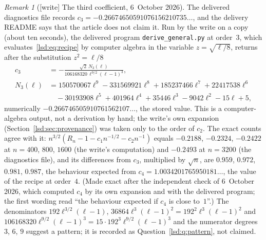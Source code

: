 \documentclass[11pt]{article}
\theoremstyle{remark}\newtheorem{remark}{Remark}
\newcommand{\file}[1]{\nolinkurl{#1}}
\begin{document}
\begin{remark}[{[write]} The third coefficient, 6~October 2026]\label{lsd:rem:c3}
The delivered diagnostics file records $c_3=-0.26674650591076156210735\ldots$,
and the delivery README says that the article does not claim it. Run by the
write on a copy (about ten seconds), the delivered program
\file{derive_general.py} at order~$3$, which evaluates~\eqref{lsd:eq:recipe}
by computer algebra in the variable $z=\sqrt{\ell/8}$, returns after the
substitution $z^2=\ell/8$
\begin{align*}
 c_3&=-\frac{\sqrt2\,N_3(\ell)}{106168320\,\ell^{9/2}(\ell-1)^3},\\
 N_3(\ell)&=150570067\ell^9-331569921\ell^8+185237466\ell^7+22417538\ell^6\\
 &\quad-30193908\ell^5+401964\ell^4+35446\ell^3-9042\ell^2-15\ell+5,
\end{align*}
numerically $-0.266746505910761562107\ldots$, the stored value. This is a
computer-algebra output, not a derivation by hand; the write's own expansion
(Section~\ref{lsd:sec:provenance}) was taken only to the order of $c_2$. The
exact counts agree with it: $n^{3/2}(R_n-1-c_1n^{-1/2}-c_2n^{-1})$ equals
$-0.2188$, $-0.2324$, $-0.2422$ at $n=400$, $800$, $1600$ (the write's
computation) and $-0.2493$ at $n=3200$ (the diagnostics file), and its
differences from $c_3$, multiplied by $\sqrt n$, are $0.959$, $0.972$,
$0.981$, $0.987$, the behaviour expected from
$c_4=1.0034201765950181\ldots$, the value of the recipe at order~$4$.
\textup{(Made exact after the independent check of 6~October 2026, which
computed $c_4$ by its own expansion and with the delivered program; the first
wording read ``the behaviour expected if $c_4$ is close to~$1$''.)} The
denominators $192\ell^{3/2}(\ell-1)$, $36864\ell^3(\ell-1)^2=192^2\ell^3(\ell-1)^2$
and $106168320\ell^{9/2}(\ell-1)^3=15\cdot192^3\ell^{9/2}(\ell-1)^3$ and the
numerator degrees $3$, $6$, $9$ suggest a pattern; it is recorded as
Question~\ref{lsd:q:pattern}, not claimed.
\end{remark}
\end{document}
